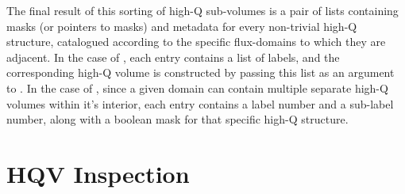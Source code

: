 \documentclass[10pt]{aastex62}
\begin{document}
\begin{itemize}
The final result of this sorting of high-Q sub-volumes is a pair of lists containing masks (or pointers to masks) and metadata for every non-trivial high-Q structure, catalogued according to the specific flux-domains to which they are adjacent.
In the case of , each entry contains a list of labels, and the corresponding high-Q volume is constructed by passing this list as an argument to .
In the case of , since a given domain can contain multiple separate high-Q volumes within it's interior, each entry contains a label number and a sub-label number, along with a boolean mask for that specific high-Q structure. 

\section{HQV Inspection}


\end{itemize}
\end{document}
